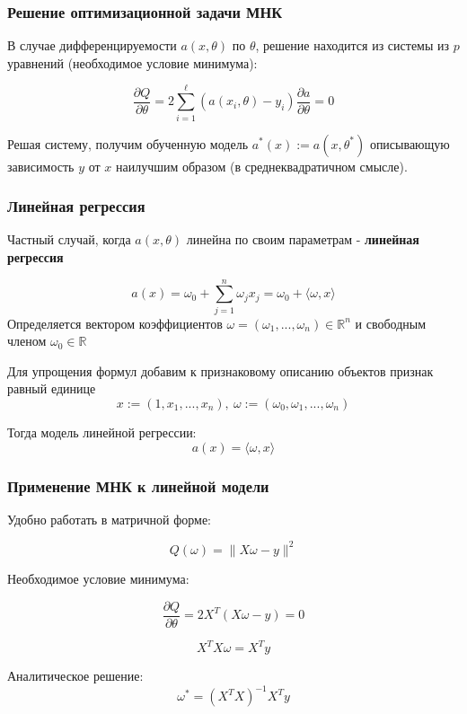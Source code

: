 \documentclass{beamer}
\begin{document}
	\begin{frame}
		\frametitle{Решение оптимизационной задачи МНК}
		В случае дифференцируемости $a(x, \theta)$ по $\theta$, решение находится из системы из $p$ уравнений (необходимое условие минимума):
		
		$$
		\frac{\partial Q}{\partial \theta} = 2 \sum_{i=1}^{\ell} (a(x_i, \theta) - y_i) \frac{\partial a}{\partial \theta} = 0
		$$
		
		\vspace{15pt}
		
		Решая систему, получим обученную модель $a^{*}(x) := a(x, \theta^{*})$ описывающую зависимость $y$ от $x$ наилучшим образом (в среднеквадратичном смысле).		
	\end{frame}
	
	
	\begin{frame}
		\frametitle{Линейная регрессия}
		
		Частный случай, когда $a(x, \theta)$ линейна по своим параметрам - \textbf{линейная регрессия}
		
		$$
		a(x) = \omega_0 + \sum_{j=1}^{n} \omega_j x_j = 
		\omega_0 + \langle \omega, x\rangle 
		$$
		Определяется вектором коэффициентов $\omega = (\omega_1, ..., \omega_n) \in \mathbb{R}^{n}$ и свободным членом $\omega_0 \in \mathbb{R}$
		
		\vspace{5pt}
		
		Для упрощения формул добавим к признаковому описанию объектов признак равный единице 
		$$x := (1, x_1, ..., x_n), \
		 \omega := (\omega_0, \omega_1, ..., \omega_{n})$$
		 
		Тогда модель линейной регрессии:
		$$
		a(x) = \langle \omega, x \rangle
		$$
	\end{frame}	

	
	\begin{frame}
		\frametitle{Применение МНК к линейной модели}
		Удобно работать в матричной форме:
		
		$$ Q(\omega) = \|X\omega - y\|^{2} $$
		
		Необходимое условие минимума:
		
		$$ \frac{\partial Q}{\partial \theta} = 2X^{T} (X\omega - y) = 0$$
		
		$$ X^{T}X\omega = X^{T}y $$
		
		Аналитическое решение:
		$$ \omega^{*} = (X^{T}X)^{-1} X^{T} y $$
	\end{frame}
\end{document}
